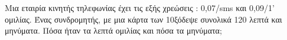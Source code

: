Μια εταιρία κινητής τηλεφωνίας έχει τις εξής χρεώσεις : 0{,}07\officialeuro/sms και 0{,}09\officialeuro/1' ομιλίας. Ένας συνδρομητής, με μια κάρτα των 10\officialeuro\;ξόδεψε συνολικά 120 λεπτά και μηνύματα. Πόσα ήταν τα λεπτά ομιλίας και πόσα τα μηνύματα;
